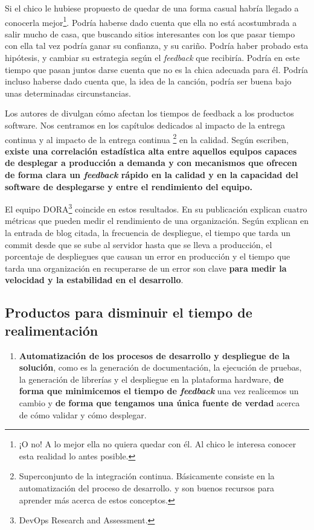 Si el chico le hubiese propuesto de quedar de una forma casual
habría llegado a conocerla mejor\footnote{¡O no! A lo mejor ella no
quiera quedar con él. Al chico le interesa
conocer esta realidad lo antes posible.}. Podría haberse dado cuenta que
ella no está acostumbrada a salir mucho de casa, que buscando sitios
interesantes con los que pasar tiempo con ella tal vez podría ganar su
confianza, y su cariño. Podría haber probado esta hipótesis, y cambiar
su estrategia según el \textit{feedback} que recibiría. Podría en este tiempo que
pasan juntos darse cuenta que no es la chica adecuada para él. Podría
incluso haberse dado cuenta que, la idea de la canción, podría ser buena
bajo unas determinadas circunstancias.

Los autores de \cite{accelerate} divulgan cómo afectan los tiempos de feedback
a los productos software. Nos centramos en los capítulos dedicados al impacto de
la entrega continua y al impacto de la entrega continua%
\footnote{%
Superconjunto de la integración continua. Básicamente consiste en la automatización
del proceso de desarrollo. \cite{ModernSoftwareEngineering} y \cite{minimumViableCD}
son buenos recursos para aprender más acerca de estos conceptos.%
}%
en la calidad. Según escriben, \textbf{existe una correlación estadística alta entre aquellos
equipos capaces de desplegar a producción a demanda y 
con mecanismos que ofrecen de forma clara un \textit{feedback} rápido en
la calidad y en la capacidad del software de desplegarse y entre el rendimiento del
equipo.}

El equipo DORA\footnote{DevOps Research and Assessment.} coincide en estos resultados.
En su publicación \cite{EliteDevOps} explican cuatro métricas que pueden medir el
rendimiento de una organización. Según explican en la entrada de blog citada,
la frecuencia de despliegue, el tiempo que tarda un commit desde que se sube
al servidor hasta que se lleva a producción,
el porcentaje de despliegues que causan un error en producción y el tiempo
que tarda una organización en recuperarse de un error son clave \textbf{para medir la
velocidad y la estabilidad en el desarrollo}.

\subsection{Productos para disminuir el tiempo de realimentación}

\begin{enumerate}
    \item \textbf{Automatización de los procesos de desarrollo y despliegue de la solución}, como es
    la generación de documentación, la ejecución de pruebas, la generación de librerías
    y el despliegue en la plataforma hardware, \textbf{de forma que minimicemos el tiempo de \textit{feedback}}
    una vez realicemos un cambio y \textbf{de forma que tengamos una única fuente de verdad} acerca de cómo
    validar y cómo desplegar.
\end{enumerate}

